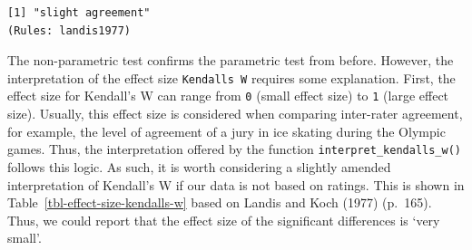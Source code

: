 \documentclass[
  letterpaper,
]{krantz}
\makeatletter
\newenvironment{Shaded}{\begin{snugshade}}{\end{snugshade}}
\newcommand{\FunctionTok}[1]{\textcolor[rgb]{0.28,0.35,0.67}{#1}}
\newcommand{\NormalTok}[1]{\textcolor[rgb]{0.00,0.23,0.31}{#1}}
\newcommand{\SpecialCharTok}[1]{\textcolor[rgb]{0.37,0.37,0.37}{#1}}
\newenvironment{kframe}{%
\medskip{}
\setlength{\fboxsep}{.8em}
 \def\at@end@of@kframe{}%
 \ifinner\ifhmode%
  \def\at@end@of@kframe{\end{minipage}}%
  \begin{minipage}{\columnwidth}%
 \fi\fi%
 \def\FrameCommand##1{\hskip\@totalleftmargin \hskip-\fboxsep
 \colorbox{shadecolor}{##1}\hskip-\fboxsep
     \hskip-\linewidth \hskip-\@totalleftmargin \hskip\columnwidth}%
 \MakeFramed {\advance\hsize-\width
   \@totalleftmargin\z@ \linewidth\hsize
   \@setminipage}}%
 {\par\unskip\endMakeFramed%
 \at@end@of@kframe}
\renewenvironment{Shaded}{\begin{kframe}}{\end{kframe}}
\makeatother
\begin{document}
\begin{Shaded}
\end{Shaded}

\begin{verbatim}
[1] "slight agreement"
(Rules: landis1977)
\end{verbatim}

The non-parametric test confirms the parametric test from before.
However, the interpretation of the effect size
\texttt{Kendall\textquotesingle{}s\ W} requires some explanation. First,
the effect size for Kendall's W can range from \texttt{0} (small effect
size) to \texttt{1} (large effect size). Usually, this effect size is
considered when comparing inter-rater agreement, for example, the level
of agreement of a jury in ice skating during the Olympic games. Thus,
the interpretation offered by the function
\texttt{interpret\_kendalls\_w()} follows this logic. As such, it is
worth considering a slightly amended interpretation of Kendall's W if
our data is not based on ratings. This is shown in
Table~\ref{tbl-effect-size-kendalls-w} based on Landis and Koch (1977)
(p.~165). Thus, we could report that the effect size of the significant
differences is `very small'.
\end{document}
